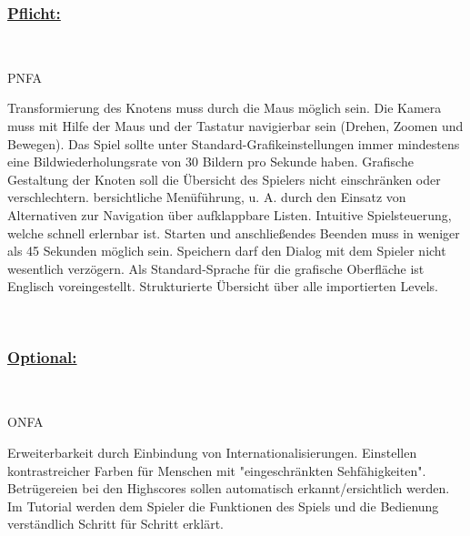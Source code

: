 %
%


%
%
\renewcommand{\K}{}


%
%
\subsubsection*{\underline{Pflicht:}}~\\

\begin{ids}{\gls{PNFA\K}} 

 	\id[10] Transformierung des Knotens muss durch die Maus möglich sein.
 	\id[20] Die Kamera muss mit Hilfe der Maus und der Tastatur navigierbar sein (Drehen,
Zoomen und Bewegen).
 	\id[30] Das Spiel sollte unter Standard-Grafikeinstellungen immer mindestens eine Bildwiederholungsrate von 30 Bildern pro Sekunde haben.
 	\id[40] Grafische Gestaltung der Knoten soll die Übersicht des Spielers nicht einschränken oder verschlechtern.
 	bersichtliche Menüführung, u. A. durch den Einsatz von Alternativen zur Navigation über aufklappbare Listen.
  	\id[60] Intuitive Spielsteuerung, welche schnell erlernbar ist.
  	\id[70] Starten und anschließendes Beenden muss in weniger als 45 Sekunden möglich sein.
  	\id[80] Speichern darf den Dialog mit dem Spieler nicht wesentlich verzögern.
  	\id[90] Als Standard-Sprache für die grafische Oberfläche ist Englisch voreingestellt.
  	\id[100] Strukturierte Übersicht über alle importierten Levels.
  		

	
\end{ids}

~\\


%
%
\subsubsection*{\underline{Optional:}}~\\


\begin{ids}{\gls{ONFA\K}}

 	\id[110] Erweiterbarkeit durch Einbindung von Internationalisierungen.
 	\id[120] Einstellen kontrastreicher Farben für Menschen mit "eingeschränkten Sehfähigkeiten".
  	\id[130] Betrügereien bei den Highscores sollen automatisch erkannt/ersichtlich werden.
  	\id[140] Im Tutorial werden dem Spieler die Funktionen des Spiels und die Bedienung verständlich Schritt für Schritt erklärt.  
	
\end{ids}

~\\